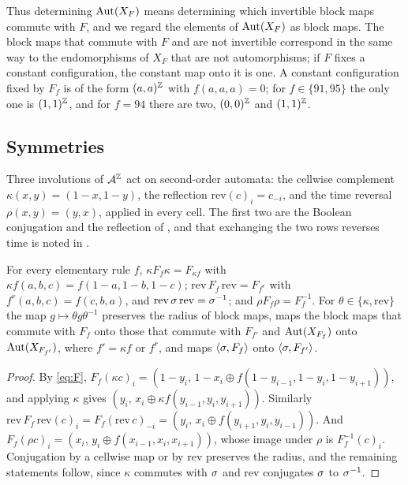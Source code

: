 Thus determining $\operatorname{Aut}(X_F)$ means determining which invertible block maps commute with $F$, and we regard the elements of $\operatorname{Aut}(X_F)$ as block maps. The block maps that commute with $F$ and are not invertible correspond in the same way to the endomorphisms of $X_F$ that are not automorphisms; if $F$ fixes a constant configuration, the constant map onto it is one. A constant configuration fixed by $F_f$ is of the form $(a,a)^{\mathbb{Z}}$ with $f(a,a,a)=0$; for $f\in\{91,95\}$ the only one is $(1,1)^{\mathbb{Z}}$, and for $f=94$ there are two, $(0,0)^{\mathbb{Z}}$ and $(1,1)^{\mathbb{Z}}$.

\subsection{Symmetries}
Three involutions of $\mathcal{A}^{\mathbb{Z}}$ act on second-order automata: the cellwise complement $\kappa(x,y)=(1-x,1-y)$, the reflection $\mathrm{rev}(c)_i=c_{-i}$, and the time reversal $\rho(x,y)=(y,x)$, applied in every cell. The first two are the Boolean conjugation and the reflection of \cite[Section~2]{Takesue1989}, and that exchanging the two rows reverses time is noted in \cite[p.~2500]{Takesue1987}.

\begin{lemma}\label{lem:classes}
For every elementary rule $f$, $\kappa F_f\kappa=F_{\kappa f}$ with $\kappa f(a,b,c)=f(1-a,1-b,1-c)$; $\mathrm{rev}\,F_f\,\mathrm{rev}=F_{f^r}$ with $f^r(a,b,c)=f(c,b,a)$, and $\mathrm{rev}\,\sigma\,\mathrm{rev}=\sigma^{-1}$; and $\rho F_f\rho=F_f^{-1}$. For $\theta\in\{\kappa,\mathrm{rev}\}$ the map $g\mapsto\theta g\theta^{-1}$ preserves the radius of block maps, maps the block maps that commute with $F_f$ onto those that commute with $F_{f'}$ and $\operatorname{Aut}(X_{F_f})$ onto $\operatorname{Aut}(X_{F_{f'}})$, where $f'=\kappa f$ or $f^r$, and maps $\langle\sigma,F_f\rangle$ onto $\langle\sigma,F_{f'}\rangle$.
\end{lemma}

\begin{proof}
By \eqref{eq:F}, $F_f(\kappa c)_i=(1-y_i,\,1-x_i\oplus f(1-y_{i-1},1-y_i,1-y_{i+1}))$, and applying $\kappa$ gives $(y_i,\,x_i\oplus\kappa f(y_{i-1},y_i,y_{i+1}))$. Similarly $\mathrm{rev}\,F_f\,\mathrm{rev}(c)_i=F_f(\mathrm{rev}\,c)_{-i}=(y_i,\,x_i\oplus f(y_{i+1},y_i,y_{i-1}))$. And $F_f(\rho c)_i=(x_i,\,y_i\oplus f(x_{i-1},x_i,x_{i+1}))$, whose image under $\rho$ is $F_f^{-1}(c)_i$. Conjugation by a cellwise map or by $\mathrm{rev}$ preserves the radius, and the remaining statements follow, since $\kappa$ commutes with $\sigma$ and $\mathrm{rev}$ conjugates $\sigma$ to $\sigma^{-1}$.
\end{proof}

